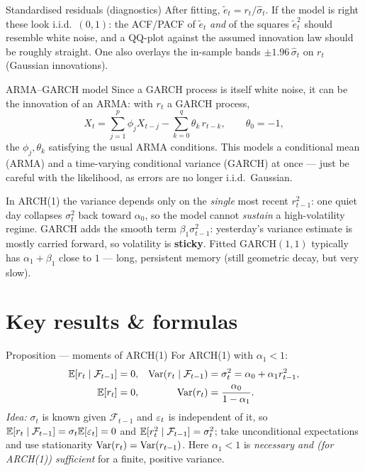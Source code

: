 \documentclass[11pt]{article}
\begin{document}
\begin{defn}{Standardised residuals (diagnostics)}
After fitting, $\tilde e_t=r_t/\hat\sigma_t$. If the model is right these look i.i.d.\ $(0,1)$:
the ACF/PACF of $\tilde e_t$ \emph{and} of the squares $\tilde e_t^2$ should resemble white noise,
and a QQ-plot against the assumed innovation law should be roughly straight. One also overlays the
in-sample bands $\pm1.96\,\hat\sigma_t$ on $r_t$ (Gaussian innovations).
\end{defn}

\begin{defn}{ARMA--GARCH model}
Since a GARCH process is itself white noise, it can be the innovation of an ARMA: with $r_t$ a
GARCH process,
\[
X_t=\sum_{j=1}^{p}\phi_j X_{t-j}-\sum_{k=0}^{q}\theta_k\,r_{t-k},\qquad \theta_0=-1,
\]
the $\phi_j,\theta_k$ satisfying the usual ARMA conditions. This models a conditional mean (ARMA)
and a time-varying conditional variance (GARCH) at once --- just be careful with the likelihood, as
errors are no longer i.i.d.\ Gaussian.
\end{defn}

\begin{intu}
In ARCH(1) the variance depends only on the \emph{single} most recent $r_{t-1}^2$: one quiet day
collapses $\sigma_t^2$ back toward $\alpha_0$, so the model cannot \emph{sustain} a high-volatility
regime. GARCH adds the smooth term $\beta_1\sigma_{t-1}^2$: yesterday's variance estimate is mostly
carried forward, so volatility is \textbf{sticky}. Fitted GARCH$(1,1)$ typically has
$\alpha_1+\beta_1$ close to $1$ --- long, persistent memory (still geometric decay, but very slow).
\end{intu}

\section*{Key results \& formulas}

\begin{result}{Proposition --- moments of ARCH(1)}
For ARCH(1) with $\alpha_1<1$:
\[
\begin{aligned}
\mathbb{E}[r_t\mid\mathcal F_{t-1}]&=0, & \operatorname{Var}(r_t\mid\mathcal F_{t-1})&=\sigma_t^2=\alpha_0+\alpha_1 r_{t-1}^2,\\
\mathbb{E}[r_t]&=0, & \operatorname{Var}(r_t)&=\frac{\alpha_0}{1-\alpha_1}.
\end{aligned}
\]
\textit{Idea:} $\sigma_t$ is known given $\mathcal F_{t-1}$ and $\varepsilon_t$ is independent of it, so
$\mathbb{E}[r_t\mid\mathcal F_{t-1}]=\sigma_t\mathbb{E}[\varepsilon_t]=0$ and $\mathbb{E}[r_t^2\mid\mathcal F_{t-1}]=\sigma_t^2$;
take unconditional expectations and use stationarity $\operatorname{Var}(r_t)=\operatorname{Var}(r_{t-1})$. Here $\alpha_1<1$ is
\emph{necessary and (for ARCH(1)) sufficient} for a finite, positive variance.
\end{result}
\end{document}
